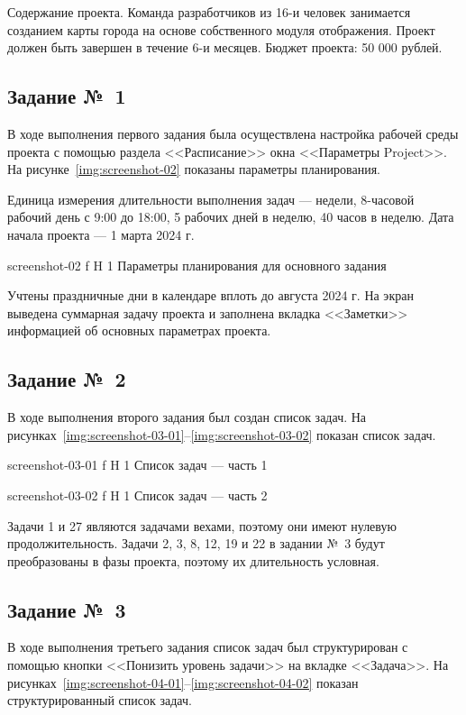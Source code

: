 \documentclass{bmstu}
\begin{document}
Содержание проекта. 
Команда разработчиков из 16-и человек занимается созданием карты города на основе собственного модуля отображения. 
Проект должен быть завершен в течение 6-и месяцев. 
Бюджет проекта: 50 000 рублей.

\subsection{Задание №~1}

В ходе выполнения первого задания была осуществлена настройка рабочей среды проекта с помощью раздела <<Расписание>> окна <<Параметры Project>>. 
На рисунке~\ref{img:screenshot-02} показаны параметры планирования.

Единица измерения длительности выполнения задач --- недели, 8-часовой рабочий день с 9:00 до 18:00, 5 рабочих дней в неделю, 40 часов в неделю. 
Дата начала проекта --- 1 марта 2024 г.
    
    {screenshot-02}
    {f}
    {H}
    {1\textwidth}
    {Параметры планирования для основного задания}
    
Учтены праздничные дни в календаре вплоть до августа 2024 г. 
На экран выведена суммарная задачу проекта и заполнена вкладка <<Заметки>> информацией об основных параметрах проекта.

\subsection{Задание №~2}

В ходе выполнения второго задания был создан список задач. 
На рисунках~\ref{img:screenshot-03-01}--\ref{img:screenshot-03-02} показан список задач.
    
    {screenshot-03-01}
    {f}
    {H}
    {1\textwidth}
    {Список задач --- часть 1}
    
    {screenshot-03-02}
    {f}
    {H}
    {1\textwidth}
    {Список задач --- часть 2}
    
Задачи 1 и 27 являются задачами вехами, поэтому они имеют нулевую
продолжительность. 
Задачи 2, 3, 8, 12, 19 и 22 в задании №~3 будут преобразованы в фазы проекта, поэтому их длительность условная.

\subsection{Задание №~3}

В ходе выполнения третьего задания список задач был структурирован с помощью кнопки <<Понизить уровень задачи>> на вкладке <<Задача>>. 
На рисунках~\ref{img:screenshot-04-01}--\ref{img:screenshot-04-02} показан структурированный список задач.
    
\end{document}
